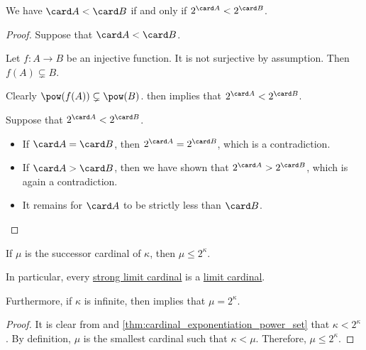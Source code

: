 \begin{corollary}\label{thm:cardinal_exponentiation_comparison}
  We have \( \card A < \card B \) if and only if \( 2^{\card A} < 2^{\card B} \).
\end{corollary}
\begin{proof}
  \SufficiencySubProof Suppose that \( \card A < \card B \).

  Let \( f: A \to B \) be an injective function. It is not surjective by assumption. Then \( f(A) \subsetneq B \).

  Clearly \( \pow(f(A)) \subsetneq \pow(B) \).  then implies that \( 2^{\card A} < 2^{\card B} \).

  \NecessitySubProof Suppose that \( 2^{\card A} < 2^{\card B} \).
  \begin{itemize}
    \item If \( \card A = \card B \), then \( 2^{\card A} = 2^{\card B} \), which is a contradiction.
    \item If \( \card A > \card B \), then we have shown that \( 2^{\card A} > 2^{\card B} \), which is again a contradiction.
    \item It remains for \( \card A \) to be strictly less than \( \card B \).
  \end{itemize}
\end{proof}

\begin{proposition}\label{thm:strong_limit_cardinal_is_weak_limit}
  If \( \mu \) is the successor cardinal of \( \kappa \), then \( \mu \leq 2^\kappa \).

  In particular, every \hyperref[def:strong_limit_cardinal]{strong limit cardinal} is a \hyperref[def:strong_limit_cardinal]{limit cardinal}.

  Furthermore, if \( \kappa \) is infinite, then  implies that \( \mu = 2^\kappa \).
\end{proposition}
\begin{proof}
  It is clear from  and \cref{thm:cardinal_exponentiation_power_set} that \( \kappa < 2^\kappa \). By definition, \( \mu \) is the smallest cardinal such that \( \kappa < \mu \). Therefore, \( \mu \leq 2^\kappa \).
\end{proof}
